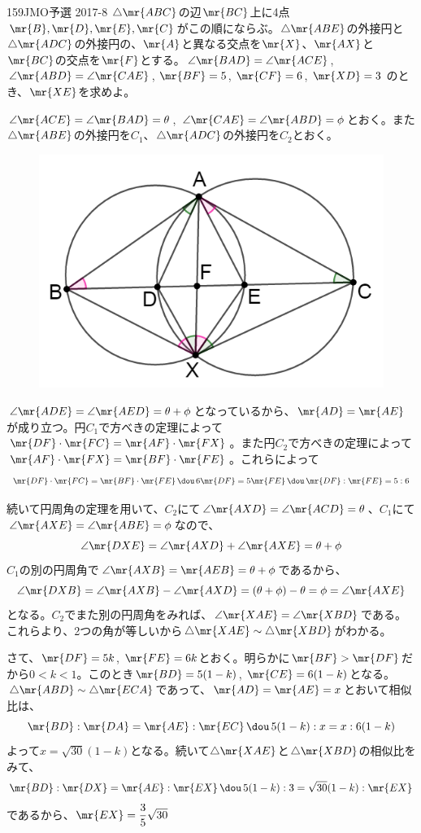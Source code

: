 \begin{thm}{159}{}{JMO予選 2017-8}
 $\triangle\mr{ABC}$の辺$\mr{BC}$上に4点$\mr{B}, \mr{D}, \mr{E}, \mr{C}$がこの順にならぶ。$\triangle\mr{ABE}$の外接円と$\triangle\mr{ADC}$の外接円の、$\mr{A}$と異なる交点を$\mr{X}$、$\mr{AX}$と$\mr{BC}$の交点を$\mr{F}$とする。$\angle\mr{BAD}=\angle\mr{ACE}$, $\angle\mr{ABD}=\angle\mr{CAE}$, $\mr{BF}=5$, $\mr{CF}=6$, $\mr{XD}=3$ のとき、$\mr{XE}$を求めよ。
\end{thm}

$\angle\mr{ACE}=\angle\mr{BAD}=\theta$, $\angle\mr{CAE}=\angle\mr{ABD}=\phi$とおく。また$\triangle\mr{ABE}$の外接円を$C_1$、$\triangle\mr{ADC}$の外接円を$C_2$とおく。
\begin{figure}[H]
 \centering
 \includegraphics[width=0.8\linewidth]{../problems/Q_159/A_159.png}
\end{figure}
$\angle\mr{ADE}=\angle\mr{AED}=\theta+\phi$となっているから、$\mr{AD}=\mr{AE}$が成り立つ。円$C_1$で方べきの定理によって$\mr{DF}\cdot\mr{FC}=\mr{AF}\cdot\mr{FX}$。また円$C_2$で方べきの定理によって$\mr{AF}\cdot\mr{FX}=\mr{BF}\cdot\mr{FE}$。これらによって
\[ \mr{DF}\cdot\mr{FC}=\mr{BF}\cdot\mr{FE} \,\dou\, 6\mr{DF}=5\mr{FE} \,\dou\, \mr{DF}:\mr{FE}=5:6 \]

続いて円周角の定理を用いて、$C_2$にて$\angle\mr{AXD}=\angle\mr{ACD}=\theta$、$C_1$にて$\angle\mr{AXE}=\angle\mr{ABE}=\phi$なので、
\[ \angle\mr{DXE}=\angle\mr{AXD}+\angle\mr{AXE}=\theta+\phi \]
$C_1$の別の円周角で$\angle\mr{AXB}=\mr{AEB}=\theta+\phi$であるから、
\[ \angle\mr{DXB}=\angle\mr{AXB}-\angle\mr{AXD}=(\theta+\phi)-\theta=\phi=\angle\mr{AXE} \]
となる。$C_2$でまた別の円周角をみれば、$\angle\mr{XAE}=\angle\mr{XBD}$である。これらより、2つの角が等しいから$\triangle\mr{XAE}\sim\triangle\mr{XBD}$がわかる。

さて、$\mr{DF}=5k$, $\mr{FE}=6k$とおく。明らかに$\mr{BF}>\mr{DF}$だから$0<k<1$。このとき$\mr{BD}=5(1-k)$, $\mr{CE}=6(1-k)$となる。$\triangle\mr{ABD}\sim\triangle\mr{ECA}$であって、$\mr{AD}=\mr{AE}=x$とおいて相似比は、
\[ \mr{BD}:\mr{DA}=\mr{AE}:\mr{EC} \,\dou\, 5(1-k):x=x:6(1-k) \]
よって$x=\sqrt{30}(1-k)$となる。続いて$\triangle\mr{XAE}$と$\triangle\mr{XBD}$の相似比をみて、
\[ \mr{BD}:\mr{DX}=\mr{AE}:\mr{EX} \,\dou\, 5(1-k):3=\sqrt{30}(1-k):\mr{EX} \]
であるから、$\mr{EX}=\dfrac{3}{5}\sqrt{30}$
